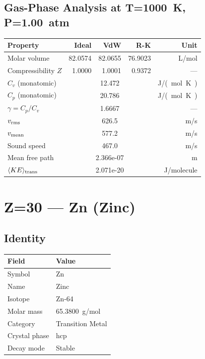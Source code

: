 \documentclass[11pt,a4paper]{article}
\begin{document}
\subsection{Gas-Phase Analysis at T=\SI{1000}{K}, P=\SI{1.00}{atm}}
\begin{tabular}{lrrrr}
  \toprule
  Property & Ideal & VdW & R-K & Unit \\
  \midrule
  Molar volume & 82.0574 & 82.0655 & 76.9023 & \si{L/mol} \\
  Compressibility $Z$ & 1.0000 & 1.0001 & 0.9372 & --- \\
  \midrule
  $C_v$ (monatomic) & \multicolumn{3}{c}{12.472} & \si{J/(mol.K)} \\
  $C_p$ (monatomic) & \multicolumn{3}{c}{20.786} & \si{J/(mol.K)} \\
  $\gamma = C_p/C_v$ & \multicolumn{3}{c}{1.6667} & --- \\
  $v_{\rm rms}$ & \multicolumn{3}{c}{626.5} & \si{m/s} \\
  $v_{\rm mean}$ & \multicolumn{3}{c}{577.2} & \si{m/s} \\
  Sound speed & \multicolumn{3}{c}{467.0} & \si{m/s} \\
  Mean free path & \multicolumn{3}{c}{2.366e-07} & \si{m} \\
  $\langle KE \rangle_{\rm trans}$ & \multicolumn{3}{c}{2.071e-20} & \si{J/molecule} \\
  \bottomrule
\end{tabular}

\newpage

\section{Z=30 --- Zn (Zinc)}
\label{sec:Z30}

\subsection{Identity}
\begin{tabular}{ll}
  \toprule
  Field & Value \\
  \midrule
  Symbol & Zn \\
  Name & Zinc \\
  Isotope & Zn-64 \\
  Molar mass & \SI{65.3800}{g/mol} \\
  Category & Transition Metal \\
  Crystal phase & hcp \\
  Decay mode & Stable \\
  \bottomrule
\end{tabular}
\end{document}
